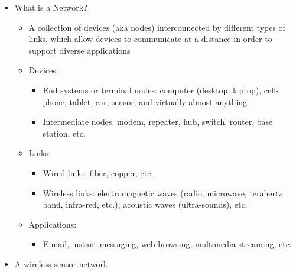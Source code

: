\begin{itemize}

  \item What is a Network?

    \begin{itemize}

      \item A collection of devices (aka nodes) interconnected by different types of links, which allow devices to communicate at a distance in order to support diverse applications

      \item Devices:

        \begin{itemize}

          \item End systems or terminal nodes: computer (desktop, laptop), cell-phone, tablet, car, sensor, and virtually almost anything

          \item Intermediate nodes: modem, repeater, hub, switch, router, base station, etc.

        \end{itemize}

      \item Links:

        \begin{itemize}

          \item Wired links: fiber, copper, etc.

          \item Wireless links: electromagnetic waves (radio, microwave, terahertz band, infra-red, etc.), acoustic waves (ultra-sounds), etc.

        \end{itemize}

      \item Applications:

        \begin{itemize}

          \item E-mail, instant messaging, web browsing, multimedia streaming, etc.

        \end{itemize}

    \end{itemize}

  \item A wireless sensor network


\end{itemize}

